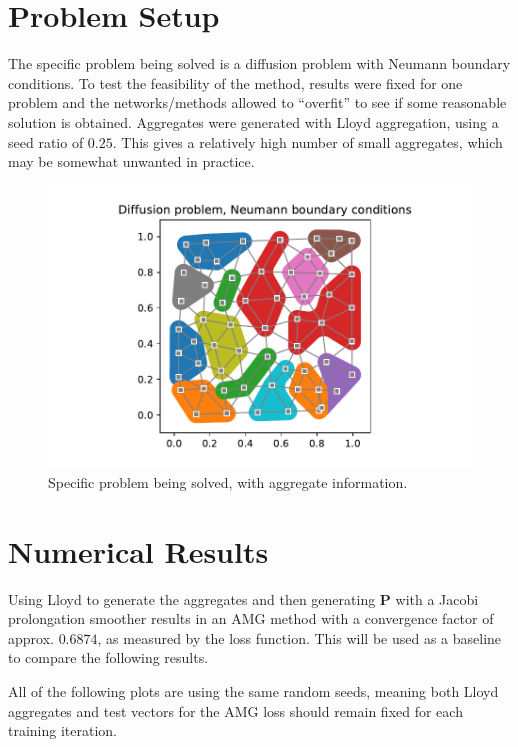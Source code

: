 \documentclass{article}
\newcommand{\mat}[1]{\bm{{#1}}}
\begin{document}
\section{Problem Setup}
The specific problem being solved is a diffusion problem with Neumann boundary conditions.  To test the feasibility of the method, results were fixed for one problem and the networks/methods allowed to ``overfit'' to see if some reasonable solution is obtained.  Aggregates were generated with Lloyd aggregation, using a seed ratio of $0.25$.  This gives a relatively high number of small aggregates, which may be somewhat unwanted in practice.

\begin{figure}[h]
  \includegraphics[width=\textwidth]{figures/diffusion-lloyd-aggregates.pdf}
  \caption{Specific problem being solved, with aggregate information.}
  \label{fig:lloyd_aggregates}
\end{figure}

\section{Numerical Results}
Using Lloyd to generate the aggregates and then generating $\mat{P}$ with a Jacobi prolongation smoother results in an AMG method with a convergence factor of approx. $0.6874$, as measured by the loss function.  This will be used as a baseline to compare the following results.

All of the following plots are using the same random seeds, meaning both Lloyd aggregates and test vectors for the AMG loss should remain fixed for each training iteration.
\end{document}

